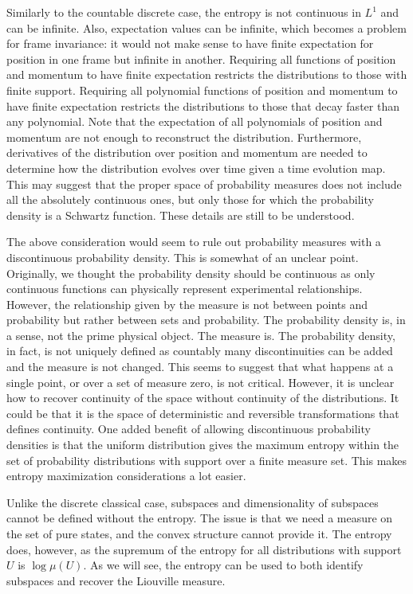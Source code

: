 Similarly to the countable discrete case, the entropy is not continuous in $L^1$ and can be infinite. Also, expectation values can be infinite, which becomes a problem for frame invariance: it would not make sense to have finite expectation for position in one frame but infinite in another. Requiring all functions of position and momentum to have finite expectation restricts the distributions to those with finite support. Requiring all polynomial functions of position and momentum to have finite expectation restricts the distributions to those that decay faster than any polynomial. Note that the expectation of all polynomials of position and momentum are not enough to reconstruct the distribution. Furthermore, derivatives of the distribution over position and momentum are needed to determine how the distribution evolves over time given a time evolution map. This may suggest that the proper space of probability measures does not include all the absolutely continuous ones, but only those for which the probability density is a Schwartz function. These details are still to be understood.

The above consideration would seem to rule out probability measures with a discontinuous probability density. This is somewhat of an unclear point. Originally, we thought the probability density should be continuous as only continuous functions can physically represent experimental relationships. However, the relationship given by the measure is not between points and probability but rather between sets and probability. The probability density is, in a sense, not the prime physical object. The measure is. The probability density, in fact, is not uniquely defined as countably many discontinuities can be added and the measure is not changed. This seems to suggest that what happens at a single point, or over a set of measure zero, is not critical. However, it is unclear how to recover continuity of the space without continuity of the distributions. It could be that it is the space of deterministic and reversible transformations that defines continuity. One added benefit of allowing discontinuous probability densities is that the uniform distribution gives the maximum entropy within the set of probability distributions with support over a finite measure set. This makes entropy maximization considerations a lot easier.

Unlike the discrete classical case, subspaces and dimensionality of subspaces cannot be defined without the entropy. The issue is that we need a measure on the set of pure states, and the convex structure cannot provide it. The entropy does, however, as the supremum of the entropy for all distributions with support $U$ is $\log \mu(U)$. As we will see, the entropy can be used to both identify subspaces and recover the Liouville measure.

